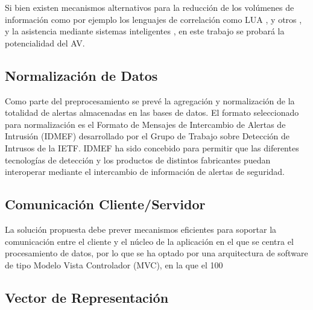\documentclass[a4paper]{./plantillas/llncs}
\begin{document}
Si bien existen mecanismos alternativos para la reducción de los volúmenes de información como por ejemplo los lenguajes de correlación como LUA \cite{b3}, y otros \cite{b4} \cite{b5} \cite{b6}, y la asistencia mediante sistemas inteligentes \cite{b7} \cite{b8} \cite{b9} \cite{b10}, en este trabajo se probará la potencialidad del AV. 



\subsection{Normalización de Datos}

Como parte del preprocesamiento se prevé la agregación y normalización de la totalidad de alertas almacenadas en las bases de datos. El formato seleccionado para normalización es el Formato de Mensajes de Intercambio de Alertas de Intrusión (IDMEF) \cite{b11} desarrollado por el Grupo de Trabajo sobre Detección de Intrusos de la IETF. IDMEF ha sido concebido para permitir que las diferentes tecnologías de detección y los productos de distintos fabricantes puedan interoperar mediante el intercambio de información de alertas de seguridad.


\subsection{Comunicación Cliente/Servidor}

La solución propuesta debe prever mecanismos eficientes para soportar la comunicación entre el cliente y el núcleo de la aplicación en el que se centra el procesamiento de datos, por lo que se ha optado por una arquitectura de software de tipo Modelo Vista Controlador (MVC), en la que el 100%

\subsection{Vector de Representación}
\end{document}
